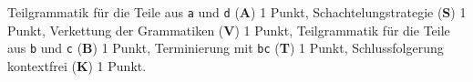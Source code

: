 \begin{bewertung}
Teilgrammatik für die Teile aus \texttt{a} und \texttt{d} ({\bf A}) 1 Punkt,
Schachtelungstrategie ({\bf S}) 1 Punkt,
Verkettung der Grammatiken ({\bf V}) 1 Punkt,
Teilgrammatik für die Teile aus \texttt{b} und \texttt{c} ({\bf B}) 1 Punkt,
Terminierung mit \texttt{bc} ({\bf T}) 1 Punkt,
Schlussfolgerung kontextfrei ({\bf K}) 1 Punkt.
\end{bewertung}

